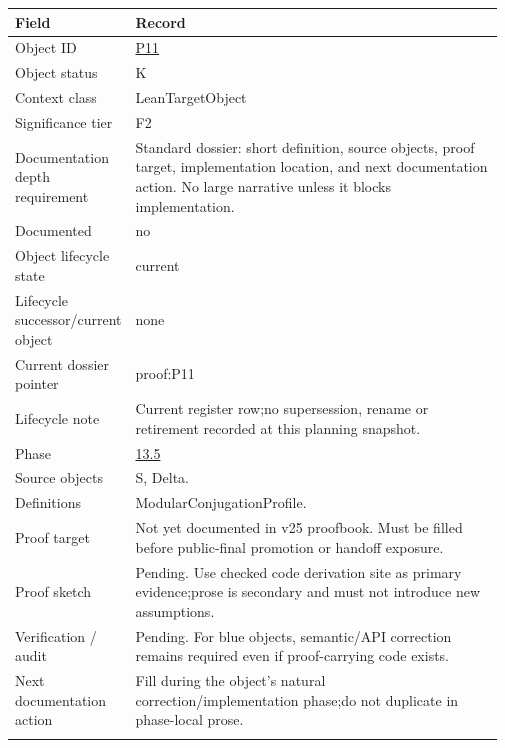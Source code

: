 \begin{longtable}{L{0.16\linewidth} L{0.81\linewidth}}
\hline
\textbf{Field} & \textbf{Record}\\
\hline
Object ID & \hyperlink{object-row-P11}{P11}\\
\hline\addlinespace[0.20em]
Object status & K\\
\hline\addlinespace[0.20em]
Context class & LeanTargetObject\\
\hline\addlinespace[0.20em]
Significance tier & F2\\
\hline\addlinespace[0.20em]
Documentation depth requirement & Standard dossier: short definition, source objects, proof target, implementation location, and next documentation action. No large narrative unless it blocks implementation.\\
\hline\addlinespace[0.20em]
Documented & no\\
\hline\addlinespace[0.20em]
Object lifecycle state & current\\
\hline\addlinespace[0.20em]
Lifecycle successor/\allowbreak{}current object & none\\
\hline\addlinespace[0.20em]
Current dossier pointer & proof:P11\\
\hline\addlinespace[0.20em]
Lifecycle note & Current register row;\newline no supersession, rename or retirement recorded at this planning snapshot.\\
\hline\addlinespace[0.20em]
Phase & \hyperlink{phase-row-13-5}{13.5}\\
\hline\addlinespace[0.20em]
Source objects & S, Delta.\\
\hline\addlinespace[0.20em]
Definitions & ModularConjugationProfile.\\
\hline\addlinespace[0.20em]
Proof target & Not yet documented in v25 proofbook. Must be filled before public-final promotion or handoff exposure.\\
\hline\addlinespace[0.20em]
Proof sketch & Pending. Use checked code derivation site as primary evidence;\newline prose is secondary and must not introduce new assumptions.\\
\hline\addlinespace[0.20em]
Verification /\allowbreak{} audit & Pending. For blue objects, semantic/\allowbreak{}API correction remains required even if proof-carrying code exists.\\
\hline\addlinespace[0.20em]
Next documentation action & Fill during the object's natural correction/\allowbreak{}implementation phase;\newline do not duplicate in phase-local prose.\\
\hline\addlinespace[0.20em]
\end{longtable}
